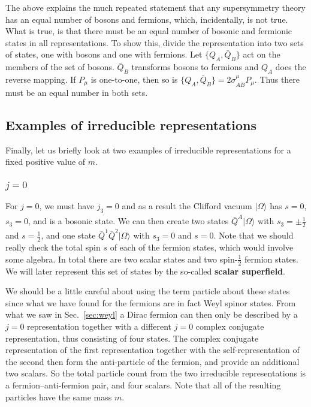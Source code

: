 \documentclass[notes.tex]{subfiles}
\begin{document}
The above explains the much repeated statement that any supersymmetry theory has an equal number of bosons and fermions, which, incidentally, is not true. What is true, is that there must be an equal number of bosonic and fermionic states in all representations.
To show this, divide the representation into two sets of states, one with bosons and one with fermions. Let $\{Q_A, \bar{Q}_{\dot{B}}\}$ act on the members of the set of bosons. $\bar{Q}_{\dot{B}}$ transforms bosons to fermions and $Q_A$ does the reverse mapping. If $P_\mu$ is one-to-one, then so is $\{Q_A, \bar{Q}_{\dot{B}}\} = 2\sigma^\mu_{A\dot{B}}P_\mu$. Thus there must be an equal number in both sets.

\subsection{Examples of irreducible representations}
\label{sec:SP_irreps}
Finally, let us briefly look at two examples of irreducible representations for a fixed positive value of $m$.

\subsubsection{$j=0$}
For $j=0$, we must have $j_3=0$ and as a result the Clifford vacuum $|\Omega\rangle$ has $s=0$, $s_3=0$, and is a bosonic state. We can then create two states $\bar{Q}^{\dot{A}}|\Omega\rangle$ with $s_3 = \pm\frac{1}{2}$ and $s = \frac{1}{2}$,  and one state $\bar{Q}^{\dot{1}}\bar{Q}^{\dot{2}}|\Omega\rangle$ with $s_3 = 0$ and $s = 0$. Note that we should really check the total spin $s$ of each of the fermion states, which would involve some algebra. In total there are two scalar states and two spin-$\frac{1}{2}$ fermion states. We will later represent this set of states by the so-called {\bf scalar superfield}. 

We should be a little careful about using the term particle about these states since what we have found for the fermions are in fact Weyl spinor states. From what we saw in Sec.~\ref{sec:weyl} a Dirac fermion can then only be described by a $j=0$ representation together with a different $j=0$ complex conjugate representation, thus consisting of four states.
The complex conjugate representation of the first representation together with the self-representation of the second then form the anti-particle of the fermion, and provide an additional two scalars. So the total particle count from the two irreducible representations is a fermion--anti-fermion pair, and four scalars. Note that all of the resulting particles have the same mass $m$.
\end{document}
